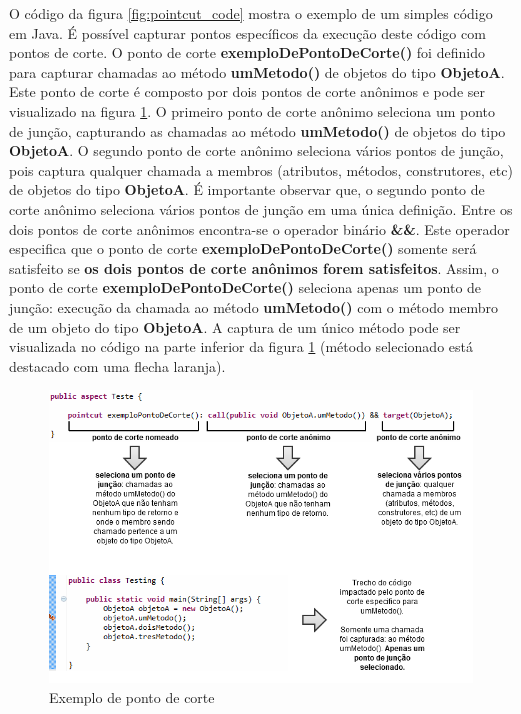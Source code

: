O código da figura \ref{fig:pointcut_code} mostra o exemplo de um simples código
em Java. É possível capturar pontos específicos da execução deste código
com pontos de corte. O ponto de corte \textbf{exemploDePontoDeCorte()} foi
definido para capturar chamadas ao método \textbf{umMetodo()} de objetos do tipo \textbf{ObjetoA}. 
Este ponto de corte é composto por dois pontos de corte anônimos e pode ser 
visualizado na figura \ref{fig:pointcut_vs_joinpoint}. O primeiro ponto de corte
anônimo seleciona um ponto de junção, capturando as chamadas ao método \textbf{umMetodo()} de 
objetos do tipo \textbf{ObjetoA}. O segundo ponto de corte anônimo seleciona vários
pontos de junção, pois captura qualquer chamada a membros (atributos, métodos,
construtores, etc) de objetos do tipo \textbf{ObjetoA}. 
É importante observar que, o segundo ponto de corte anônimo seleciona vários
pontos de junção em uma única definição. Entre os dois pontos de corte anônimos 
encontra-se o operador binário \textbf{\&\&}. Este operador especifica que o ponto de corte
\textbf{exemploDePontoDeCorte()} somente será satisfeito se \textbf{os dois
pontos de corte anônimos forem satisfeitos}. Assim, o ponto de corte
\textbf{exemploDePontoDeCorte()} seleciona apenas um ponto de junção: execução da
chamada ao método \textbf{umMetodo()} com o método membro de um objeto do
tipo \textbf{ObjetoA}. A captura de um único método pode ser visualizada no
código na parte inferior da figura \ref{fig:pointcut_vs_joinpoint}
(método selecionado está destacado com uma flecha laranja).

\begin{landscape}
\begin{figure}
	\centering
	\includegraphics[scale=0.9]{img/pointcut_vs_joinpoint.png}
	\caption{Exemplo de ponto de corte}\label{fig:pointcut_vs_joinpoint}
\end{figure}
\end{landscape}


